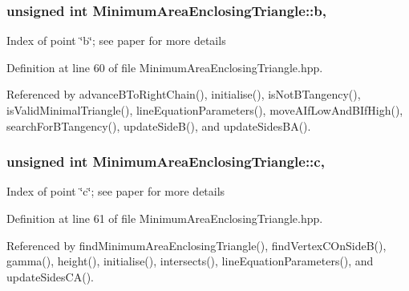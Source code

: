 \hypertarget{classmultiscale_1_1MinimumAreaEnclosingTriangle_a88aa912aa1199f163d60b2a11c3948aa}{
\subsubsection[{b}]{\setlength{\rightskip}{0pt plus 5cm}unsigned int Minimum\-Area\-Enclosing\-Triangle\-::b\hspace{0.3cm}{\ttfamily [static]}, {\ttfamily [private]}}}\label{classmultiscale_1_1MinimumAreaEnclosingTriangle_a88aa912aa1199f163d60b2a11c3948aa}
Index of point \char`\"{}b\char`\"{}; see paper for more details 

Definition at line 60 of file Minimum\-Area\-Enclosing\-Triangle.\-hpp.



Referenced by advance\-B\-To\-Right\-Chain(), initialise(), is\-Not\-B\-Tangency(), is\-Valid\-Minimal\-Triangle(), line\-Equation\-Parameters(), move\-A\-If\-Low\-And\-B\-If\-High(), search\-For\-B\-Tangency(), update\-Side\-B(), and update\-Sides\-B\-A().

\hypertarget{classmultiscale_1_1MinimumAreaEnclosingTriangle_a8de6adbe07fa09cefefd31b84e7e6ef3}{
\subsubsection[{c}]{\setlength{\rightskip}{0pt plus 5cm}unsigned int Minimum\-Area\-Enclosing\-Triangle\-::c\hspace{0.3cm}{\ttfamily [static]}, {\ttfamily [private]}}}\label{classmultiscale_1_1MinimumAreaEnclosingTriangle_a8de6adbe07fa09cefefd31b84e7e6ef3}
Index of point \char`\"{}c\char`\"{}; see paper for more details 

Definition at line 61 of file Minimum\-Area\-Enclosing\-Triangle.\-hpp.



Referenced by find\-Minimum\-Area\-Enclosing\-Triangle(), find\-Vertex\-C\-On\-Side\-B(), gamma(), height(), initialise(), intersects(), line\-Equation\-Parameters(), and update\-Sides\-C\-A().

